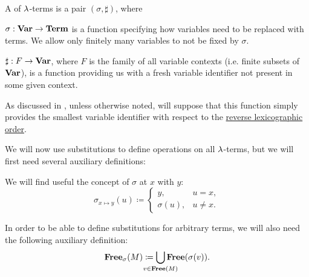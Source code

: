 \begin{definition}\label{def:lambda_substitution}\mimprovised
  A  of \( \mathrm{\lambda} \)-terms is a pair \( (\sigma, \sharp) \), where
  \begin{thmenum}[series=def:lambda_substitution]
     \( \sigma: \op*{Var} \to \op*{Term} \) is a function specifying how variables need to be replaced with terms. We allow only finitely many variables to not be fixed by \( \sigma \).

     \( \sharp: F \to \op*{Var} \), where \( F \) is the family of all variable contexts (i.e. finite subsets of \( \op*{Var} \)), is a function providing us with a fresh variable identifier not present in some given context.

    As discussed in , unless otherwise noted, will suppose that this function simply provides the smallest variable identifier with respect to the \hyperref[def:lexicographic_order]{reverse lexicographic order}.
  \end{thmenum}

  We will now use substitutions to define operations on all \( \mathrm{\lambda} \)-terms, but we will first need several auxiliary definitions:
  \begin{thmenum}[resume=def:lambda_substitution]
     We will find useful the concept of  \( \sigma \) at \( x \) with \( y \):
    \begin{equation}\label{eq:def:lambda_substitution/modified}
      \sigma_{x \mapsto y}(u) \coloneqq \begin{cases}
        y,         &u = x, \\
        \sigma(u), &u \neq x.
      \end{cases}
    \end{equation}

     In order to be able to define substitutions for arbitrary terms, we will also need the following auxiliary definition:
    \begin{equation}\label{eq:def:lambda_substitution/free}
      \op*{Free}_\sigma(M) \coloneqq \bigcup_{\mathclap{v \in \op*{Free}(M)}} \op*{Free}(\sigma(v)).
    \end{equation}


\end{thmenum}
\end{definition}
